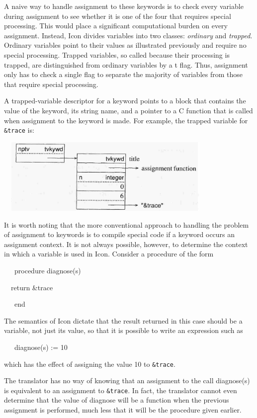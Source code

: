 A naive way to handle assignment to these keywords is to check every
variable during assignment to see whether it is one of the four that
requires special processing. This would place a significant
computational burden on every assignment.  Instead, Icon divides
variables into two classes: \textit{ordinary} and
\textit{trapped}. Ordinary variables point to their values as
illustrated previously and require no special processing. Trapped
variables, so called because their processing is
{\textquotedbl}trapped,{\textquotedbl} are distinguished from ordinary
variables by a t flag. Thus, assignment only has to check a single
flag to separate the majority of variables from those that require
special processing.

A trapped-variable descriptor for a keyword points to a block that
contains the value of the keyword, its string name, and a pointer to a
C function that is called when assignment to the keyword is made. For
example, the trapped variable for \texttt{\&trace} is:

\ \  \includegraphics[width=3.9543in,height=1.4398in]{ib-img/ib-img017.jpg} 

It is worth noting that the more conventional approach to handling the
problem of assignment to keywords is to compile special code if a
keyword occurs an assignment context. It is not always possible,
however, to determine the context in which a variable is used in
Icon. Consider a procedure of the form

{\ttfamily\mdseries
\ \ \ procedure diagnose(s)}

{\ttfamily\mdseries
\ \ return \&trace}

{\ttfamily\mdseries
\ \ \ end}

The semantics of Icon dictate that the result returned in this case
should be a variable, not just its value, so that it is possible to
write an expression such as

{\ttfamily\mdseries
\ \ \ diagnose(s) := 10}

\noindent
which has the effect of assigning the value 10 to \texttt{\&trace}.

The translator has no way of knowing that an assignment to the call
diagnose(s) is equivalent to an assignment to \texttt{\&trace}. In
fact, the translator cannot even determine that the value of diagnose
will be a function when the previous assignment is performed, much
less that it will be the procedure given earlier.

